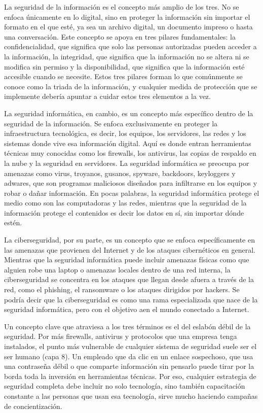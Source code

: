 \documentclass[12pt,letterpaper]{article}
\begin{document}
La seguridad de la información es el concepto más amplio de los tres. No se enfoca únicamente en lo digital, sino en proteger la información sin importar el formato en el que esté, ya sea un archivo digital, un documento impreso o hasta una conversación. Este concepto se apoya en tres pilares fundamentales: la confidencialidad, que significa que solo las personas autorizadas pueden acceder a la información, la integridad, que significa que la información no se altera ni se modifica sin permiso y la disponibilidad, que significa que la información esté accesible cuando se necesite. Estos tres pilares forman lo que comúnmente se conoce como la triada de la información, y cualquier medida de protección que se implemente debería apuntar a cuidar estos tres elementos a la vez.

La seguridad informática, en cambio, es un concepto más específico dentro de la seguridad de la información. Se enfoca exclusivamente en proteger la infraestructura tecnológica, es decir, los equipos, los servidores, las redes y los sistemas donde vive esa información digital. Aquí es donde entran herramientas técnicas muy conocidas como los firewalls, los antivirus, las copias de respaldo en la nube y la seguridad en servidores. La seguridad informática se preocupa por amenazas como virus, troyanos, gusanos, spyware, backdoors, keyloggers y adwares, que son programas maliciosos diseñados para infiltrarse en los equipos y robar o dañar información. En pocas palabras, la seguridad informática protege el medio como son las computadoras y las redes, mientras que la seguridad de la información protege el contenidos es decir los datos en sí, sin importar dónde estén.

La ciberseguridad, por su parte, es un concepto que se enfoca específicamente en las amenazas que provienen del Internet y de los ataques cibernéticos en general. Mientras que la seguridad informática puede incluir amenazas físicas como que alguien robe una laptop o amenazas locales dentro de una red interna, la ciberseguridad se concentra en los ataques que llegan desde afuera a través de la red, como el phishing, el ransomware o los ataques dirigidos por hackers. Se podría decir que la ciberseguridad es como una rama especializada que nace de la seguridad informática, pero con el objetivo aen el mundo conectado a Internet.

Un concepto clave que atraviesa a los tres términos es el del eslabón débil de la seguridad. Por más firewalls, antivirus y protocolos que una empresa tenga instalados, el punto más vulnerable de cualquier sistema de seguridad suele ser el ser humano (capa 8). Un empleado que da clic en un enlace sospechoso, que usa una contraseña débil o que comparte información sin pensarlo puede tirar por la borda toda la inversión en herramientas técnicas. Por eso, cualquier estrategia de seguridad completa debe incluir no solo tecnología, sino también capacitación constante a las personas que usan esa tecnología, sirve mucho haciendo campañas de concientización.
\end{document}

